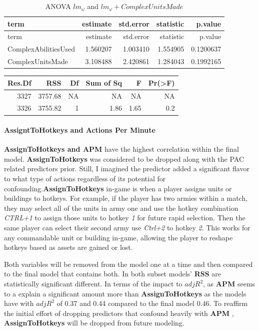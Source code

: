 \documentclass[]{article}
\let\oldparagraph\paragraph
\renewcommand{\paragraph}[1]{\oldparagraph{#1}\mbox{}}
\begin{document}
\begin{longtable}[]{@{}lrrrr@{}}
\caption{ANOVA \(lm_\omega\) and
\(lm_\omega+ComplexUnitsMade\)}\tabularnewline
\toprule
term & estimate & std.error & statistic & p.value\tabularnewline
\midrule
\endfirsthead
\toprule
term & estimate & std.error & statistic & p.value\tabularnewline
\midrule
\endhead
ComplexAbilitiesUsed & 1.560207 & 1.003410 & 1.554905 &
0.1200637\tabularnewline
ComplexUnitsMade & 3.108488 & 2.420861 & 1.284043 &
0.1992165\tabularnewline
\bottomrule
\end{longtable}

\begin{longtable}[]{@{}rrrrrr@{}}
\toprule
Res.Df & RSS & Df & Sum of Sq & F & Pr(\textgreater{}F)\tabularnewline
\midrule
\endhead
3327 & 3757.68 & NA & NA & NA & NA\tabularnewline
3326 & 3755.82 & 1 & 1.86 & 1.65 & 0.2\tabularnewline
\bottomrule
\end{longtable}

\hypertarget{assignttohotkeys-and-actions-per-minute}{%
\paragraph{AssigntToHotkeys and Actions Per
Minute}\label{assignttohotkeys-and-actions-per-minute}}

\textbf{AssignToHotkeys and APM} have the highest correlation within the
final model. \textbf{AssignToHotkeys} was considered to be dropped along
with the PAC related predictors prior. Still, I imagined the predictor
added a significant flavor to what type of actions regardless of its
potential for confounding.\textbf{AssignToHotkeys} in-game is when a
player assigns units or buildings to hotkeys. For example, if the player
has two armies within a match, they may select all of the units in army
one and use the hotkey combination \emph{CTRL+1} to assign those units
to hotkey \emph{1} for future rapid selection. Then the same player can
select their second army use \emph{Ctrl+2} to hotkey \emph{2}. This
works for any commandable unit or building in-game, allowing the player
to reshape hotkeys based as assets are gained or lost.

Both variables will be removed from the model one at a time and then
compared to the final model that contains both. In both subset models'
\textbf{RSS} are statistically significant different. In terms of the
impact to \(adjR^2\), as \textbf{APM} seems to a explain a significant
amount more than \textbf{AssignToHotkeys} as the models have with
\(adjR^2\) of 0.37 and 0.44 compared to the final model 0.46. To
reaffirm the initial effort of dropping predictors that confound heavily
with \textbf{APM} , \textbf{AssignToHotkeys} will be dropped from future
modeling.
\end{document}
